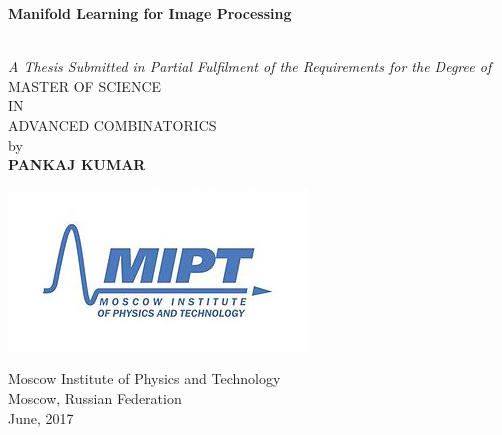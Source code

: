 \documentclass[12pt, oneside]{Thesis} %
\begin{document}
\begin{titlepage}

\begin{center}
\vfill
{ \huge \textbf{Manifold Learning for Image Processing}}\\
{ \LARGE \textbf{} }\\ %
			
\end{center}
\begin{center}
\textit{A Thesis Submitted in Partial Fulfilment of the Requirements for the Degree of}\\[1cm]
\textmd{MASTER OF SCIENCE}\\
IN\\
\textmd{ADVANCED COMBINATORICS}\\
\singlespacing
\singlespacing
\large{by}\\[0.5cm]
\singlespacing
\singlespacing
\large\textbf{PANKAJ KUMAR}\\
\singlespacing
\begin{center}
\includegraphics[scale=1]{./snulogo.png}
\end{center}
\singlespacing
\singlespacing
\begin{center}

\textmd{Moscow Institute of Physics and Technology}\\
\singlespacing
Moscow, Russian Federation\\
\singlespacing
June, 2017\\

\end{center}
\end{center}
\end{titlepage}
\end{document}
